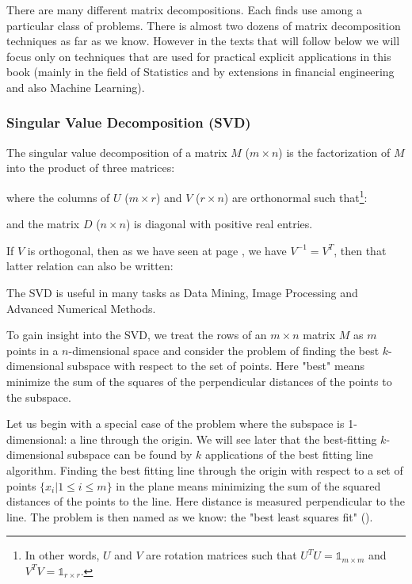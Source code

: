 	There are many different matrix decompositions. Each finds use among a particular class of problems. There is almost two dozens of matrix decomposition techniques as far as we know. However in the texts that will follow below we will focus only on techniques that are used for practical explicit applications in this book (mainly in the field of Statistics and by extensions in financial engineering and also Machine Learning).
	
	\subsubsection{Singular Value Decomposition (SVD)}\label{singula value decomposition}
	The singular value decomposition of a matrix $M$ ($m\times n$) is the factorization of $M$ into the product of three matrices:
	
	where the columns of $U$ ($m\times r$) and $V$ ($r\times n$) are orthonormal such that\footnote{In other words, $U$ and $V$ are rotation matrices such that $U^TU=\mathds{1}_{m\times m}$ and $V^TV=\mathds{1}_{r\times r}$.}:
	
	and the matrix $D$ ($n\times n$) is diagonal with positive real entries.  
	\begin{tcolorbox}[title=Remark,colframe=black,arc=10pt]
	If $V$ is orthogonal, then as we have seen at page \pageref{orthogonal matrix}, we have $V^{-1}=V^T$, then that latter relation can also be written:
	
	\end{tcolorbox}
	The SVD is useful in many tasks as Data Mining, Image Processing and Advanced Numerical Methods.

	To gain insight into the SVD, we treat the rows of an $m\times n$ matrix $M$ as $m$ points in a $n$-dimensional space and consider the problem of finding the best $k$-dimensional subspace with respect to the set of points. Here "best" means minimize the sum of the squares of the perpendicular distances of the points to the subspace. 

	Let us begin with a special case of the problem where the subspace is 1-dimensional: a line through the origin. We will see later that the best-fitting $k$-dimensional subspace can be found by $k$ applications of the best fitting line algorithm. Finding the best fitting line through the origin with respect to a set of points $\{x_i|1 \leq i \leq m\}$ in the plane means minimizing the sum of the squared distances of the points to the line. Here distance is measured perpendicular to the line. The problem is then named as we know: the "best least squares fit" ().
	
